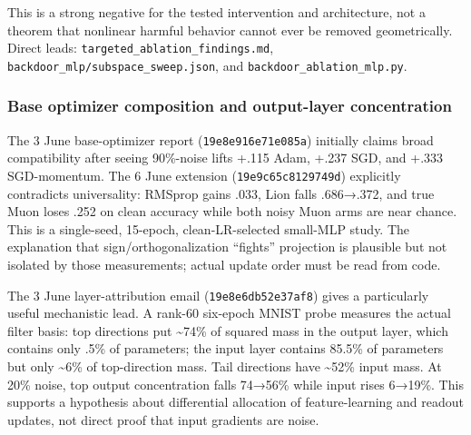 \documentclass[
  british,
  10pt,
  a4paper,
]{article}
\begin{document}
This is a strong negative for the tested intervention and
architecture\allowbreak{},\allowbreak{} not a theorem that nonlinear
harmful behavior cannot ever be removed
geometricall\allowbreak{}y.\allowbreak{} Direct leads:
\texttt{targeted\_\allowbreak{}ablation\_\allowbreak{}findings.\allowbreak{}md},
\texttt{backdoor\_\allowbreak{}mlp/\allowbreak{}subspace\_\allowbreak{}sweep.\allowbreak{}json},
and
\texttt{backdoor\_\allowbreak{}ablation\_\allowbreak{}mlp.\allowbreak{}py}.

\subsubsection{\texorpdfstring{Base optimizer composition and
output-\allowbreak{}layer
concentration}{Base optimizer composition and  concentration}}\label{email-evidence--base-optimizer-composition-and-output-layer-concentration}

The 3 June base-\allowbreak{}optimizer report
(\texttt{19e8e916e71e\allowbreak{}085a}) initially claims broad
compatibility after seeing 90\%-noise lifts +.115 Adam, +.237 SGD, and
+.333 SGD-\allowbreak{}momentum.\allowbreak{} The 6 June extension
(\texttt{19e9c65c8129\allowbreak{}749d}) explicitly contradicts
universality: RMSprop gains .033, Lion falls .686→.372, and true Muon
loses .252 on clean accuracy while both noisy Muon arms are near chance.
This is a single-\allowbreak{}seed,\allowbreak{} 15-epoch,
clean-\allowbreak{}LR-\allowbreak{}selected small-MLP study. The
explanation that sign/\allowbreak{}orthogonaliz\allowbreak{}ation
``fights'' projection is plausible but not isolated by those
measurements; actual update order must be read from code.

The 3 June layer-\allowbreak{}attribution email
(\texttt{19e8e6db52e3\allowbreak{}7af8}) gives a particularly useful
mechanistic lead. A rank-60 six-epoch MNIST probe measures the actual
filter basis: top directions put \textasciitilde74\% of squared mass in
the output layer, which contains only .5\% of parameters; the input
layer contains 85.5\% of parameters but only \textasciitilde6\% of
top-\allowbreak{}direction mass. Tail directions have
\textasciitilde52\% input mass. At 20\% noise, top output concentration
falls 74→56\% while input rises 6→19\%. This supports a hypothesis about
differential allocation of feature-\allowbreak{}learning and readout
updates, not direct proof that input gradients are noise.
\end{document}
